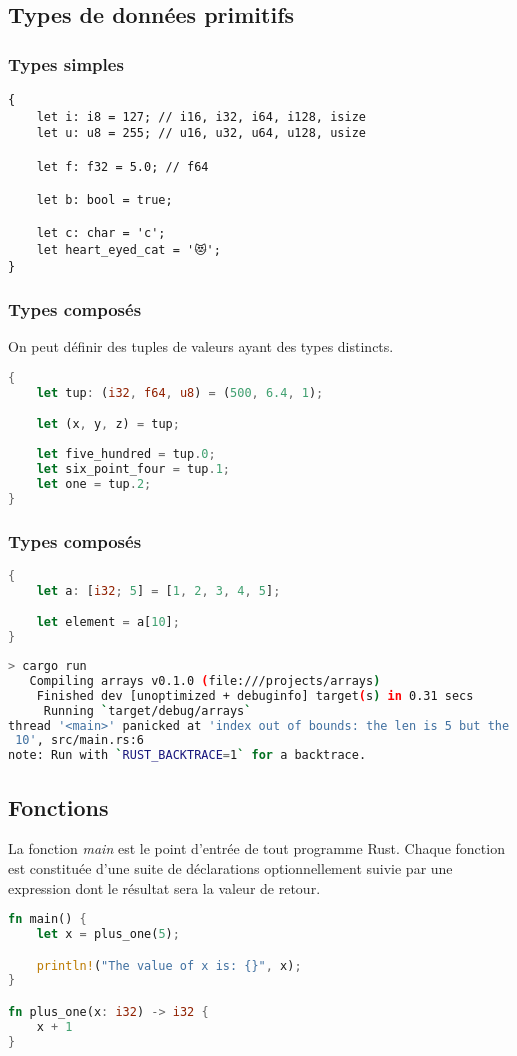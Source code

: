 \subsection{Types de données primitifs}
\begin{frame}[fragile]
  \frametitle{Types simples}
  \begin{lstlisting}
{
    let i: i8 = 127; // i16, i32, i64, i128, isize
    let u: u8 = 255; // u16, u32, u64, u128, usize
    
    let f: f32 = 5.0; // f64
    
    let b: bool = true;
    
    let c: char = 'c';
    let heart_eyed_cat = '😻';
}
  \end{lstlisting}
\end{frame}

\begin{frame}[fragile]
  \frametitle{Types composés}
On peut définir des tuples de valeurs ayant des types distincts.
  \begin{lstlisting}[language=rust]
{
    let tup: (i32, f64, u8) = (500, 6.4, 1);

    let (x, y, z) = tup;
    
    let five_hundred = tup.0;
    let six_point_four = tup.1;
    let one = tup.2;
}
  \end{lstlisting}
\end{frame}

\begin{frame}[fragile]
  \frametitle{Types composés}
  \begin{lstlisting}[language=rust]
{
    let a: [i32; 5] = [1, 2, 3, 4, 5];

    let element = a[10];
}
  \end{lstlisting}
  \begin{lstlisting}[language=bash, basicstyle=\tiny{}]
> cargo run
   Compiling arrays v0.1.0 (file:///projects/arrays)
    Finished dev [unoptimized + debuginfo] target(s) in 0.31 secs
     Running `target/debug/arrays`
thread '<main>' panicked at 'index out of bounds: the len is 5 but the index is
 10', src/main.rs:6
note: Run with `RUST_BACKTRACE=1` for a backtrace.
  \end{lstlisting}
\end{frame}

\subsection{Fonctions}
\begin{frame}[fragile]
  La fonction \textit{main} est le point d'entrée de tout programme Rust.
Chaque fonction est constituée d'une suite de déclarations optionnellement suivie par une expression dont le résultat sera la valeur de retour.
\begin{lstlisting}[language=rust]
fn main() {
    let x = plus_one(5);

    println!("The value of x is: {}", x);
}

fn plus_one(x: i32) -> i32 {
    x + 1
}
\end{lstlisting}  
\end{frame}

